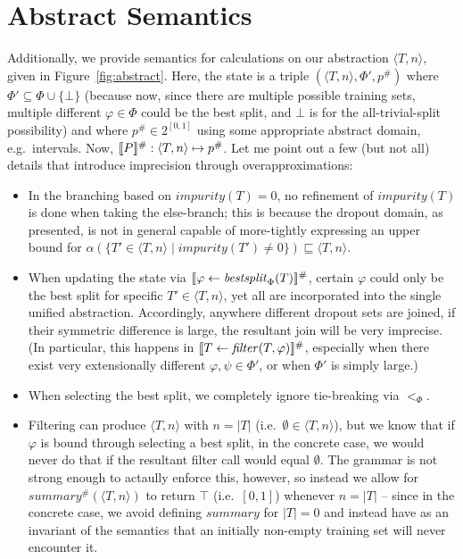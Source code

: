 \section{Abstract Semantics}

Additionally, we provide semantics for calculations on our abstraction $\langle T, n \rangle$,
given in Figure~\ref{fig:abstract}.
Here, the state is a triple $(\langle T, n \rangle, \Phi', p^\#)$
where $\Phi' \subseteq \Phi \cup \{\bot\}$
(because now, since there are multiple possible training sets,
multiple different $\varphi \in \Phi$ could be the best split,
and $\bot$ is for the all-trivial-split possibility)
and where $p^\# \in 2^{[0,1]}$
using some appropriate abstract domain, e.g.\ intervals.
Now, $\den{P}^\# : \langle T, n \rangle \mapsto p^\#$.
Let me point out a few (but not all) details
that introduce imprecision through overapproximations:
\begin{itemize}
    \item In the branching based on $\mathit{impurity}(T) = 0$,
        no refinement of $\mathit{impurity}(T)$ is done when taking the else-branch;
        this is because the dropout domain, as presented,
        is not in general capable of more-tightly expressing an upper bound for
        $\alpha(\{T' \in \langle T, n \rangle \mid \mathit{impurity}(T') \neq 0\})
        \sqsubseteq \langle T, n \rangle$.
    \item When updating the state via
        $\den{\varphi \gets \mathit{bestsplit}_\Phi(T)}^\#$,
        certain $\varphi$ could only be the best split for specific $T' \in \langle T, n \rangle$,
        yet all are incorporated into the single unified abstraction.
        Accordingly, anywhere different dropout sets are joined,
        if their symmetric difference is large, the resultant join
        will be very imprecise.
        (In particular, this happens in $\den{T \gets \mathit{filter}(T, \varphi)}^\#$,
        especially when there exist very extensionally different $\varphi, \psi \in \Phi'$,
        or when $\Phi'$ is simply large.)
    \item When selecting the best split, we completely ignore tie-breaking via $<_\Phi$.
    \item Filtering can produce $\langle T, n \rangle$ with $n = |T|$ (i.e.\ $\emptyset \in \langle T, n \rangle$),
        but we know that if $\varphi$ is bound through selecting a best split,
        in the concrete case, we would never do that if the resultant filter call would equal $\emptyset$.
        The grammar is not strong enough to actaully enforce this, however,
        so instead we allow for $\mathit{summary^\#}(\langle T, n \rangle)$
        to return $\top$ (i.e.\ $[0, 1]$) whenever $n = |T|$ --
        since in the concrete case, we avoid defining $\mathit{summary}$ for $|T| = 0$
        and instead have as an invariant of the semantics that an initially non-empty training set
        will never encounter it.
\end{itemize}


